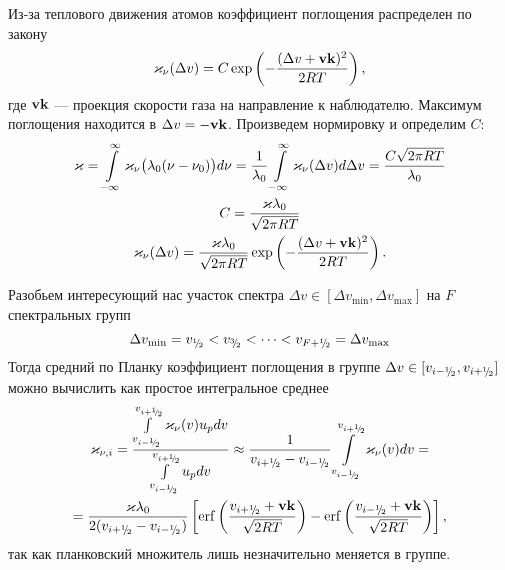 Из-за теплового движения атомов коэффициент поглощения распределен по закону
\[
\varkappa_\nu(\Delta v) = C\exp\left(-\frac{(\Delta v + \boldsymbol{\mathbf{v}}\boldsymbol{\mathbf{k}})^2}{2RT}\right),
\]
где $\boldsymbol{\mathbf{v}}\boldsymbol{\mathbf{k}}$ --- проекция скорости газа на направление к наблюдателю. Максимум поглощения находится в $\Delta v = -\boldsymbol{\mathbf{v}}\boldsymbol{\mathbf{k}}$.
Произведем нормировку и определим $C$:
\begin{gather*}
\varkappa = \int\limits_{-\infty}^\infty \varkappa_\nu\big(\lambda_0(\nu - \nu_0)\big) d\nu = 
\frac{1}{\lambda_0} \int\limits_{-\infty}^\infty \varkappa_\nu(\Delta v) d\Delta v = 
\frac{C\sqrt{2\pi RT}}{\lambda_0}\\
C = \frac{\varkappa \lambda_0}{\sqrt{2\pi RT}}\\
\varkappa_\nu(\Delta v) = \frac{\varkappa \lambda_0}{\sqrt{2\pi RT}}\exp\left(-\frac{(\Delta v + \boldsymbol{\mathbf{v}}\boldsymbol{\mathbf{k}})^2}{2RT}\right).
\end{gather*}

Разобьем интересующий нас участок спектра $\Delta v \in [\Delta v_{\min}, \Delta v_{\max}]$ на $F$ спектральных групп
\[
\Delta v_{\min} = v_{{}^{1}\mkern-5mu/{\!}_{2}} < v_{{}^{3}\mkern-5mu/{\!}_{2}} < \dots < v_{F+{}^{1}\mkern-5mu/{\!}_{2}} = \Delta v_{\max}
\]
Тогда средний по Планку коэффициент поглощения в группе $\Delta v \in [v_{i-{}^{1}\mkern-5mu/{\!}_{2}}, v_{i+{}^{1}\mkern-5mu/{\!}_{2}}]$ можно вычислить как простое интегральное среднее
\begin{multline*}
\varkappa_{\nu,i} = 
\frac{\int\limits_{v_{i-\half}}^{v_{i+\half}} \varkappa_\nu(v) u_p dv}
{\int\limits_{v_{i-\half}}^{v_{i+\half}} u_p dv}
\approx 
\frac{1}{v_{i+\half} - v_{i-\half}}\int\limits_{v_{i-\half}}^{v_{i+\half}} \varkappa_\nu(v) dv
= \\ =
\frac{\varkappa \lambda_0}{2(v_{i+\half} - v_{i-\half})} \left[
\operatorname{erf}\left(\frac{v_{i+\half} + \bvec{v}\bvec{k}}{\sqrt{2RT}}\right)
-
\operatorname{erf}\left(\frac{v_{i-\half} + \bvec{v}\bvec{k}}{\sqrt{2RT}}\right)
\right],
\end{multline*}
так как планковский множитель лишь незначительно меняется в группе.